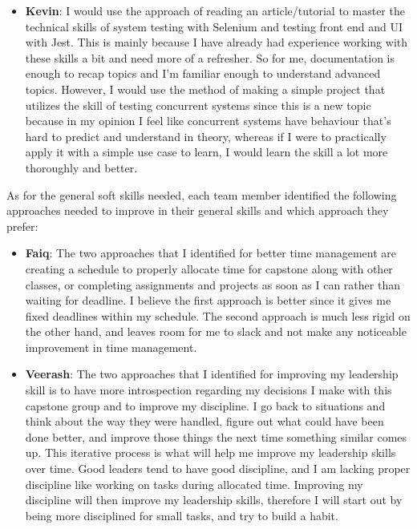 \documentclass[12pt, titlepage]{article}
\begin{document}
\begin{enumerate}
\begin{itemize}
			\item \textbf{Kevin}: I would use the approach of reading an article/tutorial to master the technical skills of system testing with Selenium and testing front end and UI with Jest. This is mainly because I have already had experience working with these skills a bit and need more of a refresher. So for me, documentation is enough to recap topics and I'm familiar enough to understand advanced topics. However, I would use the method of making a simple project that utilizes the skill of testing concurrent systems since this is a new topic because in my opinion I feel like concurrent systems have behaviour that's hard to predict and understand in theory, whereas if I were to practically apply it with a simple use case to learn, I would learn the skill a lot more thoroughly and better. 
			
		\end{itemize}
		
		As for the general soft skills needed, each team member identified the following approaches needed to improve in their general skills and which approach they prefer:
		\begin{itemize}
			\item \textbf{Faiq}: The two approaches that I identified for better time management are creating a schedule to properly allocate time for capstone along with other classes, or completing assignments and projects as soon as I can rather than waiting for deadline. I believe the first approach is better since it gives me fixed deadlines within my schedule. The second approach is much less rigid on the other hand, and leaves room for me to slack and not make any noticeable improvement in time management.
			
			\item \textbf{Veerash}: The two approaches that I identified for improving my leadership skill is to have more introspection regarding my decisions I make with this capstone group and to improve my discipline. I go back to situations and think about the way they were handled, figure out what could have been done better, and improve those things the next time something similar comes up. This iterative process is what will help me improve my leadership skills over time. Good leaders tend to have good discipline, and I am lacking proper discipline like working on tasks during allocated time. Improving my discipline will then improve my leadership skills, therefore I will start out by being more disciplined for small tasks, and try to build a habit.
			

\end{itemize}
\end{enumerate}
\end{document}
